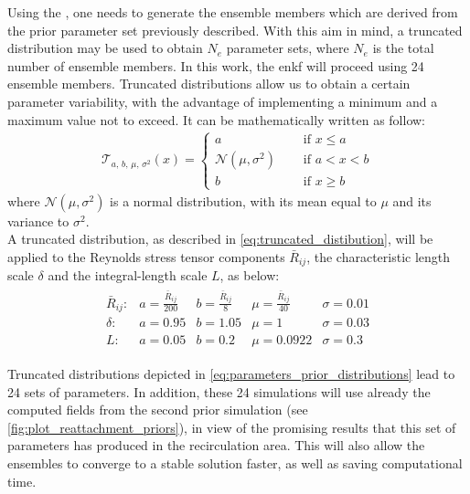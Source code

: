 \documentclass[12pt,twoside]{report}
\begin{document}
Using the , one needs to generate the ensemble members which are derived from the prior parameter set previously described. With this aim in mind, a truncated distribution may be used to obtain $N_e$ parameter sets, where $N_e$ is the total number of ensemble members. In this work, the \gls{enkf} will proceed using 24 ensemble members. Truncated distributions allow us to obtain a certain parameter variability, with the advantage of implementing a minimum and a maximum value not to exceed. It can be mathematically written as follow:
\begin{align}
    \mathcal{T}_{a,\,b,\, \mu,\, \sigma^2}\left( x \right) = 
    \begin{cases}
        a &\quad \text{ if } x \leq a \\
        \mathcal{N}\left( \mu, \sigma^2 \right) &\quad \text{ if } a<x<b \\
        b &\quad \text{ if } x \geq b
    \end{cases}
    \label{eq:truncated_distibution}
\end{align}
where $\mathcal{N}\left( \mu, \sigma^2 \right)$ is a normal distribution, with its mean equal to $\mu$ and its variance to $\sigma^2$. \\

A truncated distribution, as described in \autoref{eq:truncated_distibution}, will be applied to the Reynolds stress tensor components $\bar{R}_{ij}$, the characteristic length scale $\delta$ and the integral-length scale $L$, as below:
\begin{align}
\begin{matrix}
    \bar{R}_{ij}:  & a=\frac{\bar{R}_{ij}}{200}  & b=\frac{\bar{R}_{ij}}{8} & \mu=\frac{\bar{R}_{ij}}{40} & \sigma=0.01 \\
    \delta: &a=0.95 & b=1.05 & \mu=1 & \sigma=0.03 \\
    L: &a=0.05 & b=0.2 & \mu=0.0922 & \sigma=0.3
\end{matrix}
\label{eq:parameters_prior_distributions}
\end{align}

Truncated distributions depicted in \autoref{eq:parameters_prior_distributions} lead to 24 sets of parameters. In addition, these 24 simulations will use already the computed fields from the second prior simulation (see \autoref{fig:plot_reattachment_priors}), in view of the promising results that this set of parameters has produced in the recirculation area. This will also allow the ensembles to converge to a stable solution faster, as well as saving computational time.
\end{document}

